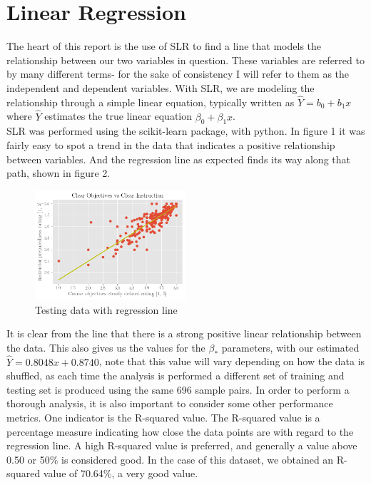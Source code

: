 \documentclass[10pt]{report}
\begin{document}
\newpage
\section*{Linear Regression}

The heart of this report is the use of SLR to find a line that models the relationship between our two variables in question. 
These variables are referred to by many different terms- for the sake of consistency I will refer to them as the independent and
dependent variables.  With SLR, we are modeling the relationship through a simple linear equation, typically written as
$ \hat Y = b_0 + b_1x$ where $\hat Y$ estimates the true linear equation $\beta_0 + \beta_1x$. \\
SLR was performed using the scikit-learn package, with python. In figure 1 it was fairly easy to spot a trend in the data that indicates
a positive relationship between variables. And the regression line as expected finds its way along that path, shown in figure 2.


\begin{figure}
    \centering
    \includegraphics[width=0.50\textwidth]{results/third_w_slr}
    \caption{Testing data with regression line}
\end{figure}


It is clear from the line that there is a strong positive linear relationship between the data. This also gives us the values
for the $\beta_*$ parameters, with our estimated $\hat Y = 0.8048x + 0.8740$, note that this value will vary depending on how the data
is shuffled, as each time the analysis is performed a different set of training and testing set is produced using
the same 696 sample pairs. In order to perform a thorough analysis, it is also important to consider some other performance metrics.
One indicator is the R-squared value. The R-squared value is a percentage measure indicating how close the data points are with regard
to the regression line. A high R-squared value is preferred, and generally a value above 0.50 or 50\% is considered good. 
In the case of this dataset, we obtained an R-squared value of 70.64\%, a very good value. 
\end{document}
